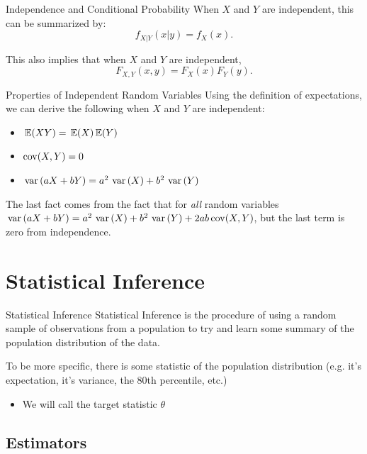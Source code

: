 \documentclass[aspectratio=169,t,11pt,table]{beamer}
\begin{document}
\begin{frame}{Independence and Conditional Probability}
  When $X$ and $Y$ are independent, this can be summarized by:
  \[
    f_{X \vert Y}(x \vert y) = f_{X}(x).
  \]

  \pause
  \bigskip
  This also implies that when $X$ and $Y$ are independent,
  \[
    F_{X,Y}(x, y) = F_{X}(x) F_{Y}(y).
  \]
\end{frame}

\begin{frame}{Properties of Independent Random Variables}
  Using the definition of expectations, we can derive the following when $X$ and $Y$ are independent:
  \begin{itemize}
    \item $\expec{XY} = \expec{X} \expec{Y}$
    \item $\cov(X, Y) = 0$
    
    \pause
    \item $\var{aX + bY} = a^2 \var{X} + b^2 \var{Y}$
  \end{itemize}
  
  \bigskip
  The last fact comes from the fact that for \emph{all} random variables $\var{aX + bY} = a^2 \var{X} + b^2 \var{Y} + 2ab \cov(X, Y)$, but the last term is zero from independence.
\end{frame}



\section{Statistical Inference}

\begin{frame}{Statistical Inference}
  \alert{Statistical Inference} is the procedure of using a random sample of observations from a population to try and learn some summary of the population distribution of the data.

  \pause
  \bigskip
  To be more specific, there is some \alert{statistic} of the population distribution (e.g. it's expectation, it's variance, the 80th percentile, etc.)
  \begin{itemize}
    \item We will call the target statistic $\theta$
  \end{itemize}
\end{frame}

\subsection*{Estimators}
\end{document}
